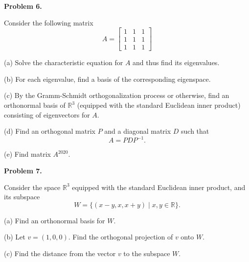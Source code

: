 \documentclass[a4paper,10pt]{article}
\def\R{\mathbb R}
\begin{document}
\noindent
{\bf Problem 6.}

\vspace{3mm}\noindent
Consider the following matrix
$$
A=\left[ \begin{array}{rcc} 1 & 1 & 1 \\ 1 & 1 & 1 \\ 1 & 1 & 1 \end{array} \right] 
$$

\vspace{1mm}\noindent
(a) Solve the characteristic equation for $A$ and thus find its eigenvalues. 

\vspace{1mm}\noindent
(b) For each eigenvalue, find a basis of the corresponding eigenspace. 

\vspace{1mm}\noindent
(c) By the Gramm-Schmidt orthogonalization process or otherwise, find an orthonormal basis of $\R^3 $
(equipped with the standard Euclidean inner product) consisting of eigenvectors for $A$. 

\vspace{1mm}\noindent
(d) Find an orthogonal matrix $P$ and a diagonal matrix $D$ such that 
$$
A=PDP^{-1}. 
$$

\vspace{1mm}\noindent
(e) Find matrix $A^{2020}$. 

\vspace{20mm}\noindent
{\bf Problem 7.}

\vspace{3mm}\noindent
Consider the space $\R^3$ equipped with the standard Euclidean inner product, and its subspace 
$$
W = \{(x-y,x,x+y) \mid x,y\in\R\}. 
$$

\vspace{1mm}\noindent
(a) Find an orthonormal basis for $W$. 

\vspace{1mm}\noindent
(b) Let $v=(1,0,0)$. Find the orthogonal projection of $v$ onto $W$. 

\vspace{1mm}\noindent
(c) Find the distance from the vector $v$ to the subspace $W$. 
\end{document}
